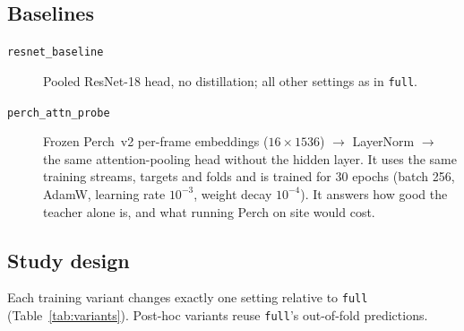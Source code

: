 \documentclass[11pt]{article}
\newcommand{\var}[1]{\texttt{#1}}
\begin{document}
\subsection{Baselines}
\begin{description}
  \item[\var{resnet\_baseline}] Pooled ResNet-18 head, no distillation; all
        other settings as in \var{full}.
  \item[\var{perch\_attn\_probe}] Frozen Perch~v2 per-frame embeddings
        ($16\times1536$) $\rightarrow$ LayerNorm $\rightarrow$ the same
        attention-pooling head without the hidden layer. It uses the same
        training streams, targets and folds and is trained for 30 epochs
        (batch 256, AdamW, learning rate $10^{-3}$, weight decay $10^{-4}$).
        It answers how good the teacher alone is, and what running Perch on
        site would cost.
\end{description}

\subsection{Study design}
\label{sec:design}
Each training variant changes exactly one setting relative to \var{full}
(Table~\ref{tab:variants}). Post-hoc variants reuse \var{full}'s
out-of-fold predictions.
\end{document}
